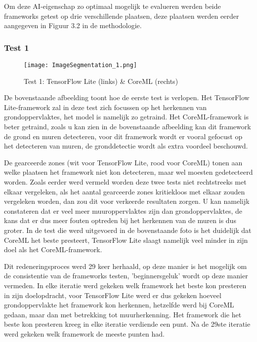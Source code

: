 Om deze AI-eigenschap zo optimaal mogelijk te evalueren werden beide frameworks getest op drie verschillende plaatsen, deze plaatsen werden eerder aangegeven in Figuur 3.2 in de methodologie.

\subsubsection{Test 1}
\begin{figure}[H]
	\centering
	\texttt{[image: ImageSegmentation\_1.png]}
	\caption{Test 1: TensorFlow Lite (links) \& CoreML (rechts)}
\end{figure}

De bovenstaande afbeelding toont hoe de eerste test is verlopen. Het TensorFlow Lite-framework zal in deze test zich focussen op het herkennen van grondoppervlaktes, het model is namelijk zo getraind. Het CoreML-framework is beter getraind, zoals u kan zien in de bovenstaande afbeelding kan dit framework de grond en muren detecteren, voor dit framework wordt er vooral gefocust op het detecteren van muren, de gronddetectie wordt als extra voordeel beschouwd.

De gearceerde zones (wit voor TensorFlow Lite, rood voor CoreML) tonen aan welke plaatsen het framework niet kon detecteren, maar wel moesten gedetecteerd worden. Zoals eerder werd vermeld worden deze twee tests niet rechtstreeks met elkaar vergeleken, als het aantal gearceerde zones kritiekloos met elkaar zouden vergeleken worden, dan zou dit voor verkeerde resultaten zorgen. U kan namelijk constateren dat er veel meer muuroppervlaktes zijn dan grondoppervlaktes, de kans dat er dus meer fouten optreden bij het herkennen van de muren is dus groter. In de test die werd uitgevoerd in de bovenstaande foto is het duidelijk dat CoreML het beste presteert, TensorFlow Lite slaagt namelijk veel minder in zijn doel als het CoreML-framework. 

Dit redeneringsproces werd 29 keer herhaald, op deze manier is het mogelijk om de consistentie van de frameworks testen,  'beginnersgeluk' wordt op deze manier vermeden. In elke iteratie werd gekeken welk framework het beste kon presteren in zijn doelopdracht, voor TensorFlow Lite werd er dus gekeken hoeveel grondoppervlakte het framework kon herkennen, hetzelfde werd bij CoreML gedaan, maar dan met betrekking tot muurherkenning. Het framework die het beste kon presteren kreeg in elke iteratie verdiende een punt. Na de 29ste iteratie werd gekeken welk framework de meeste punten had.

